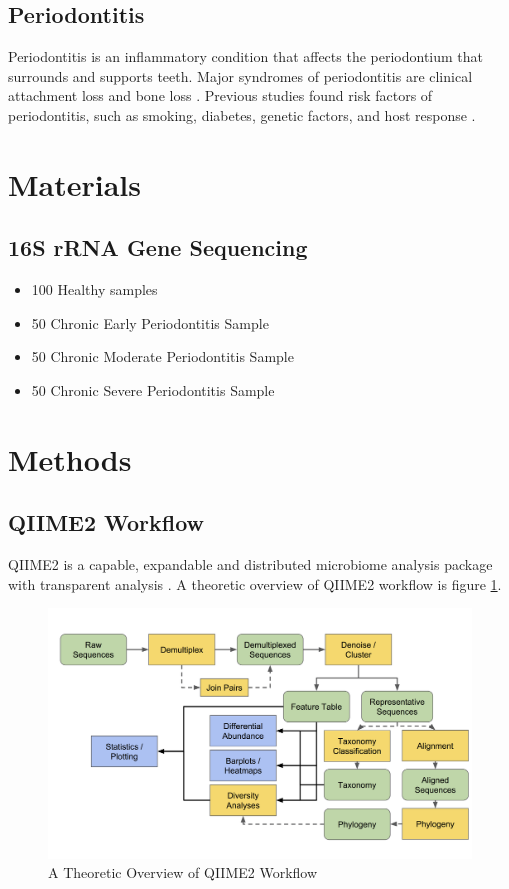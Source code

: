 \documentclass[a4paper]{article}
\begin{document}
        \subsection{Periodontitis}
            Periodontitis is an inflammatory condition that affects the periodontium that surrounds and supports teeth. Major syndromes of periodontitis are clinical attachment loss and bone loss \cite{periodontitis1}. Previous studies found risk factors of periodontitis, such as smoking, diabetes, genetic factors, and host response \cite{periodontitis2}.

    \section{Materials}
        \subsection{16S rRNA Gene Sequencing}

            \begin{itemize}
                \item 100 Healthy samples
                \item 50 Chronic Early Periodontitis Sample
                \item 50 Chronic Moderate Periodontitis Sample
                \item 50 Chronic Severe Periodontitis Sample
            \end{itemize}

    \section{Methods}
        \subsection{QIIME2 Workflow}
            QIIME2 is a capable, expandable and distributed microbiome analysis package with transparent analysis \cite{qiime1, qiime2}. A theoretic overview of QIIME2 workflow is figure \ref{fig:qiime-workflow}.

            \begin{figure}[p]
                \centering
                \includegraphics[width=0.8 \linewidth]{figures/qiime.png}
                \caption{A Theoretic Overview of QIIME2 Workflow \protect\cite{qiime1, qiime2}}
                \label{fig:qiime-workflow}
            \end{figure}
\end{document}
